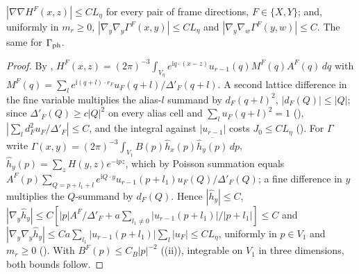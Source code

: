 \begin{lemma}\label{rot:lem:CK1}
$|\nabla\nabla H^F(x,z)|\le CL_\eta$ for every pair of frame directions, $F\in\{X,Y\}$; and, uniformly in $m_r\ge0$, $|\nabla_y\nabla_y\Gamma^F(x,y)|\le CL_\eta$ and $|\nabla_y\nabla_w\Gamma^F(y,w)|\le C$. The same for $\Gamma_{\rm ph}$.
\end{lemma}
\begin{proof}
By , $H^F(x,z)=(2\pi)^{-3}\int_{V_\eta}e^{\mathrm iq\cdot(x-z)}u_{r-1}(q)M^F(q)A^F(q)\,dq$ with $M^F(q)=\sum_le^{\mathrm i(q+l)\cdot r_F}u_F(q+l)/\Delta'_F(q+l)$. A second lattice difference in the fine variable multiplies the alias-$l$ summand by $d_F(q+l)^2$, $|d_F(Q)|\le|Q|$; since $\Delta'_F(Q)\ge c|Q|^2$ on every alias cell and $\sum_lu_F(q+l)^2=1$ (), $|\sum_ld_F^2u_F/\Delta'_F|\le C$, and the integral against $|u_{r-1}|$ costs $J_0\le CL_\eta$ (). For $\Gamma$ write $\Gamma(x,y)=(2\pi)^{-3}\int_{V_1}B(p)\hat h_x(p)\overline{\hat h_y(p)}\,dp$, $\hat h_y(p)=\sum_zH(y,z)e^{-\mathrm ipz}$, which by Poisson summation equals $A^F(p)\sum_{Q=p+l_1+l}e^{\mathrm iQ\cdot y}u_{r-1}(p+l_1)u_F(Q)/\Delta'_F(Q)$; a fine difference in $y$ multiplies the $Q$-summand by $d_F(Q)$. Hence $|\hat h_y|\le C$, $|\nabla_y\hat h_y|\le C[|p|A^F/\Delta'_F+a\sum_{l_1\ne0}|u_{r-1}(p+l_1)|/|p+l_1|]\le C$ and $|\nabla_y\nabla_y\hat h_y|\le Ca\sum_{l_1}|u_{r-1}(p+l_1)|\sum_l|u_F|\le CL_\eta$, uniformly in $p\in V_1$ and $m_r\ge0$ (). With $B^F(p)\le C_B|p|^{-2}$ ((ii)), integrable on $V_1$ in three dimensions, both bounds follow.
\end{proof}

